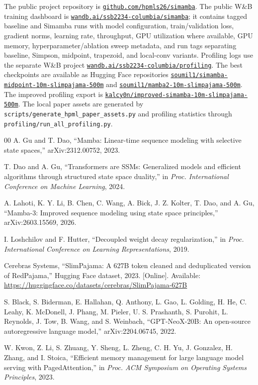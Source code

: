 \documentclass[conference]{IEEEtran}
\newcommand{\modelname}{Simamba\xspace}
\begin{document}
{\raggedright
The public project repository is
\href{https://github.com/hpmls26/simamba}{\texttt{github.com/hpmls26/simamba}}.
The public W\&B training dashboard is
\href{https://wandb.ai/ssb2234-columbia/simamba}{\texttt{wandb.ai/ssb2234-columbia/simamba}};
it contains tagged baseline and \modelname runs with model configuration,
train/validation loss, gradient norms, learning rate, throughput, GPU utilization
where available, GPU memory, hyperparameter/ablation sweep metadata, and run tags
separating baseline, Simpson, midpoint, trapezoid, and local-conv variants.
Profiling logs use the separate W\&B project \href{https://wandb.ai/ssb2234-columbia/profiling}{\texttt{wandb.ai/ssb2234-columbia/profiling}}. The best checkpoints are available as Hugging Face repositories
\href{https://huggingface.co/soumil1/simamba-midpoint-10m-slimpajama-500m}{\texttt{soumil1/simamba-midpoint-10m-slimpajama-500m}}
and \href{https://huggingface.co/soumil1/mamba2-10m-slimpajama-500m}{\texttt{soumil1/mamba2-10m-slimpajama-500m}}. The improved profiling export is
\href{https://huggingface.co/kalcy0n/improved-simamba-10m-slimpajama-500m}{\texttt{kalcy0n/improved-simamba-10m-slimpajama-500m}}. The local paper assets are generated by \texttt{scripts/generate\_hpml\_paper\_assets.py} and profiling statistics through \texttt{profiling/run\_all\_profiling.py}.
\par}


\begin{thebibliography}{00}
A. Gu and T. Dao, ``Mamba: Linear-time sequence modeling with selective state spaces,'' arXiv:2312.00752, 2023.

T. Dao and A. Gu, ``Transformers are SSMs: Generalized models and efficient algorithms through structured state space duality,'' in \textit{Proc. International Conference on Machine Learning}, 2024.

A. Lahoti, K. Y. Li, B. Chen, C. Wang, A. Bick, J. Z. Kolter, T. Dao, and A. Gu, ``Mamba-3: Improved sequence modeling using state space principles,'' arXiv:2603.15569, 2026.

I. Loshchilov and F. Hutter, ``Decoupled weight decay regularization,'' in \textit{Proc. International Conference on Learning Representations}, 2019.

Cerebras Systems, ``SlimPajama: A 627B token cleaned and deduplicated version of RedPajama,'' Hugging Face dataset, 2023. [Online]. Available: \url{https://huggingface.co/datasets/cerebras/SlimPajama-627B}

S. Black, S. Biderman, E. Hallahan, Q. Anthony, L. Gao, L. Golding, H. He, C. Leahy, K. McDonell, J. Phang, M. Pieler, U. S. Prashanth, S. Purohit, L. Reynolds, J. Tow, B. Wang, and S. Weinbach, ``GPT-NeoX-20B: An open-source autoregressive language model,'' arXiv:2204.06745, 2022.

W. Kwon, Z. Li, S. Zhuang, Y. Sheng, L. Zheng, C. H. Yu, J. Gonzalez, H. Zhang, and I. Stoica, ``Efficient memory management for large language model serving with PagedAttention,'' in \textit{Proc. ACM Symposium on Operating Systems Principles}, 2023.
\end{thebibliography}
\end{document}
